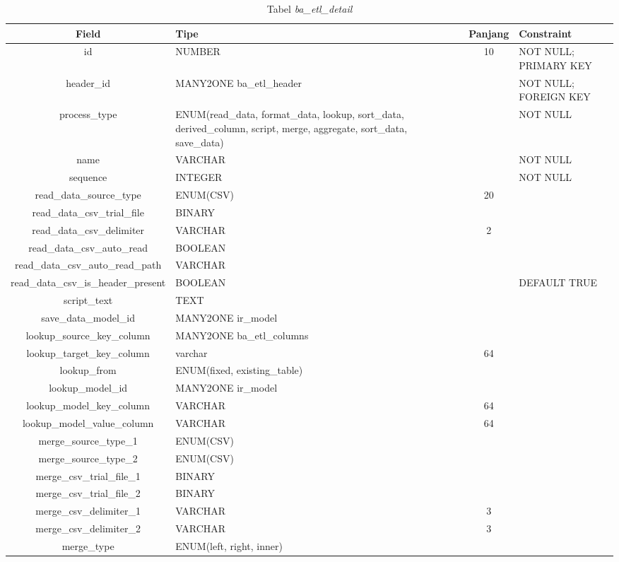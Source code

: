 \begin{table}[H]
	\centering
		\caption{Tabel \textit{ba\_etl\_detail}}
		\begin{tabular}{ |c|p{3cm}|c|p{3cm}| }
			\hline
				Field & Tipe & Panjang & Constraint \\ \hline \hline
			id & NUMBER & 10 & NOT NULL; PRIMARY KEY  \\ \hline
			header\_id & MANY2ONE ba\_etl\_header& & NOT NULL; FOREIGN KEY \\ \hline 
			process\_type & ENUM(read\_data, format\_data, lookup, sort\_data, derived\_column, script, merge, aggregate, sort\_data, save\_data)&  & NOT NULL \\ \hline 
			name & VARCHAR &  & NOT NULL \\ \hline 
			sequence & INTEGER &  & NOT NULL  \\ \hline 
			read\_data\_source\_type & ENUM(CSV) & 20 & \\ \hline
			read\_data\_csv\_trial\_file & BINARY &  & \\ \hline 
			read\_data\_csv\_delimiter & VARCHAR & 2 & \\ \hline 
			read\_data\_csv\_auto\_read & BOOLEAN &  & \\ \hline 
			read\_data\_csv\_auto\_read\_path & VARCHAR &  & \\ \hline 
			read\_data\_csv\_is\_header\_present & BOOLEAN &  & DEFAULT TRUE \\ \hline 
			script\_text & TEXT &  & \\ \hline 
			save\_data\_model\_id & MANY2ONE ir\_model &  & \\ \hline 
			lookup\_source\_key\_column & MANY2ONE ba\_etl\_columns &  & \\ \hline
			lookup\_target\_key\_column & varchar & 64 & \\ \hline
			lookup\_from & ENUM(fixed, existing\_table) &  & \\ \hline
			lookup\_model\_id & MANY2ONE ir\_model &  & \\ \hline
			lookup\_model\_key\_column & VARCHAR & 64 & \\ \hline
			lookup\_model\_value\_column & VARCHAR & 64 & \\ \hline
			merge\_source\_type\_1 & ENUM(CSV) &  & \\ \hline
			merge\_source\_type\_2 & ENUM(CSV) &  & \\ \hline
			merge\_csv\_trial\_file\_1 & BINARY &  & \\ \hline
			merge\_csv\_trial\_file\_2 & BINARY &  & \\ \hline
			merge\_csv\_delimiter\_1 & VARCHAR & 3 & \\ \hline
			merge\_csv\_delimiter\_2 & VARCHAR & 3 & \\ \hline
			merge\_type & ENUM(left, right, inner) &  & \\ \hline
		\end{tabular}
\end{table}

